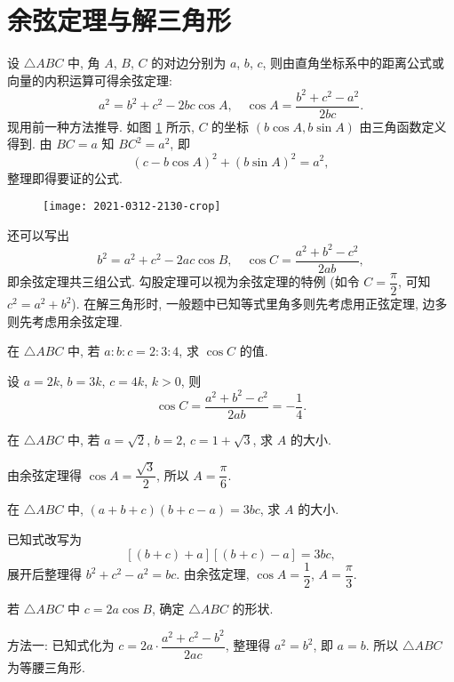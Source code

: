 
\section{余弦定理与解三角形}

设 $\triangle ABC$ 中, 角 $A$, $B$, $C$ 的对边分别为 $a$, $b$, $c$, 
则由直角坐标系中的距离公式或向量的内积运算可得余弦定理: 
\[a^2= b^2+ c^2- 2bc\cos A,\quad\cos A=\frac{b^2+c^2-a^2}{2bc}.\]
现用前一种方法推导. 如图 \ref{fig:2021-0312-2130} 所示, 
$C$ 的坐标 $(b\cos A,b\sin A)$ 由三角函数定义得到. 由 $BC=a$ 知 $BC^2= a^2$, 即
\[(c-b\cos A)^2+ (b\sin A)^2= a^2,\]
整理即得要证的公式. 

\begin{figure}[hb]
    \centering
    \texttt{[image: 2021-0312-2130-crop]}
    \caption{}\label{fig:2021-0312-2130}
\end{figure}

还可以写出
\[b^2= a^2+ c^2- 2ac\cos B,\quad\cos C=\frac{a^2+b^2-c^2}{2ab},\]
即余弦定理共三组公式. 勾股定理可以视为余弦定理的特例 (如令 $C=\dfrac\pi2$, 可知 $c^2= a^2+b^2$). 在解三角形时, 一般题中已知等式里角多则先考虑用正弦定理, 边多则先考虑用余弦定理.

\lianxi
\begin{exercise}
    在 $\triangle ABC$ 中, 若 $a:b:c=2:3:4$, 求 $\cos C$ 的值.
\end{exercise}
\beginsolution
    设 $a=2k$, $b=3k$, $c=4k$, $k>0$, 则
    \[\cos C= \dfrac{a^2+b^2-c^2}{2ab}= -\frac14.\]
\endsolution

\begin{exercise}
    在 $\triangle ABC$ 中, 若 $a=\sqrt2$, $b=2$, $c=1+\sqrt3$, 求 $A$ 的大小.
\end{exercise}
\beginsolution
    由余弦定理得 $\cos A= \dfrac{\sqrt3}2$, 所以 $A=\dfrac\pi6$.
\endsolution

\begin{exercise}
    在 $\triangle ABC$ 中, $(a+b+c)(b+c-a)=3bc$, 求 $A$ 的大小.
\end{exercise}
\beginsolution
    已知式改写为
    \[ [(b+c)+ a][(b+c)-a]= 3bc,\]
    展开后整理得 $b^2+c^2-a^2= bc$. 由余弦定理, $\cos A= \dfrac12$, $A=\dfrac\pi3$.
\endsolution

\begin{exercise}
    若 $\triangle ABC$ 中 $c=2a\cos B$, 确定 $\triangle ABC$ 的形状.
\end{exercise}
\beginsolution
    方法一: 已知式化为 $c=2a\cdot \dfrac{a^2+c^2- b^2}{2ac}$, 整理得 $a^2= b^2$, 即 $a=b$. 所以 $\triangle ABC$ 为等腰三角形.

